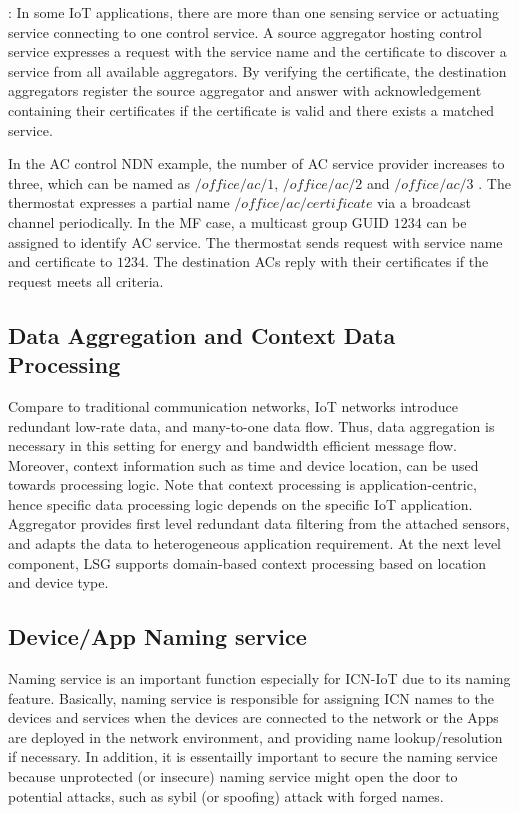 \vspace{1mm}: In some IoT applications, there are more than one sensing service or actuating service connecting to one control service. A source aggregator hosting control service expresses a request with the service name and the  certificate to discover a service from all  available aggregators. By verifying the certificate, the destination aggregators  register the source aggregator and  answer with acknowledgement containing their certificates if the certificate is valid and there exists a matched service.

In the AC control NDN example, the number of AC service provider increases to three, which can be named as $/office/ac/1$, $/office/ac/2$ and $/office/ac/3$ . The thermostat expresses a partial name $/office/ac/certificate$ via a broadcast channel periodically. In the MF case, a multicast group GUID $1234$ can be assigned to identify AC service. The thermostat sends request with service name and certificate to $1234$. The destination ACs reply with their certificates if the request meets all criteria.
\subsection{Data Aggregation and Context Data Processing}
Compare to traditional communication networks, IoT networks introduce redundant low-rate data, and many-to-one data flow. Thus, data aggregation is necessary in this setting for energy and bandwidth efficient message flow. Moreover, context information such as time and device location, can be used towards processing logic. Note that context processing is application-centric, hence specific data processing logic depends on the specific IoT application. Aggregator provides first level redundant data filtering from the attached sensors, and adapts the data to heterogeneous application requirement. At the next level component, LSG supports domain-based context processing based on location and device type.

\subsection{Device/App Naming service}
Naming service is an important function especially for ICN-IoT due to its naming feature. Basically, naming service is responsible for assigning ICN names to the devices and services when the devices are connected to the network or the Apps are deployed in the network environment, and providing name lookup/resolution if necessary. In addition, it is essentailly important to secure the naming service because unprotected (or insecure) naming service might open the door to potential attacks, such as sybil (or spoofing) attack \cite{sybil} with forged names.

